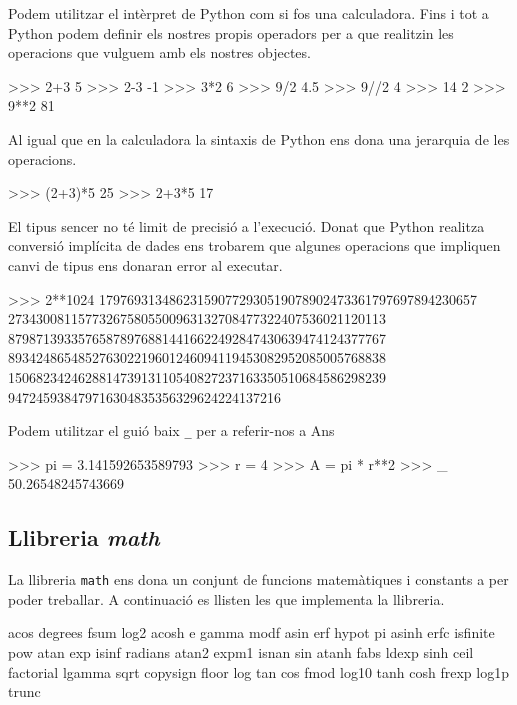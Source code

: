 Podem utilitzar el intèrpret de Python com si fos una calculadora. Fins i tot a Python podem definir els nostres propis operadors per a que realitzin les operacions que vulguem amb els nostres objectes.


\begin{tip}[caption=Operacions Python]
>>> 2+3
5
>>> 2-3
-1
>>> 3*2
6
>>> 9/2
4.5
>>> 9//2
4
>>> 14%
2
>>> 9**2
81
\end{tip}


Al igual que en la calculadora la sintaxis de Python ens dona una jerarquia de les operacions.


\begin{blockcode}
>>> (2+3)*5
25
>>> 2+3*5
17
\end{blockcode}

El tipus sencer no té limit de precisió a l'execució. Donat que Python realitza conversió implícita de dades ens trobarem que algunes operacions que impliquen canvi de tipus ens donaran error al executar.


\begin{blockcode}

>>> 2**1024
179769313486231590772930519078902473361797697894230657
273430081157732675805500963132708477322407536021120113
879871393357658789768814416622492847430639474124377767
893424865485276302219601246094119453082952085005768838
150682342462881473913110540827237163350510684586298239
947245938479716304835356329624224137216
\end{blockcode}


Podem utilitzar el guió baix {\tt \_} per a referir-nos a Ans

\begin{blockcode}
>>> pi = 3.141592653589793
>>> r = 4
>>> A = pi * r**2
>>> _
50.26548245743669
\end{blockcode}  



\subsection{Llibreria \emph{math}}

La llibreria {\tt math} ens dona un conjunt de funcions matemàtiques i constants a per poder treballar. A continuació es llisten les que implementa la llibreria.

\begin{blockcode}
acos       degrees    fsum       log2
acosh      e          gamma      modf
asin       erf        hypot      pi
asinh      erfc       isfinite   pow
atan       exp        isinf      radians
atan2      expm1      isnan      sin
atanh      fabs       ldexp      sinh
ceil       factorial  lgamma     sqrt
copysign   floor      log        tan
cos        fmod       log10      tanh
cosh       frexp      log1p      trunc
\end{blockcode}


